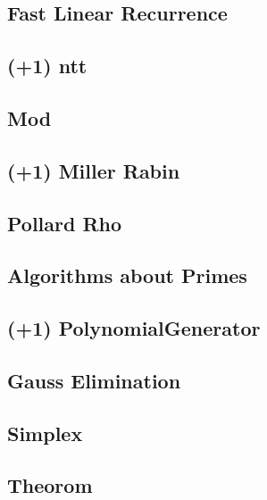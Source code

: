 \documentclass[10pt,twocolumn,oneside]{article}
\begin{document}
\subsection{Fast Linear Recurrence}


\subsection{(+1) ntt}


\subsection{Mod}


\subsection{(+1) Miller Rabin}


\subsection{Pollard Rho}


\subsection{Algorithms about Primes}


\subsection{(+1) PolynomialGenerator}


\subsection{Gauss Elimination}


\newpage

\subsection{Simplex}


\newpage

\subsection{Theorom}

\end{document}
